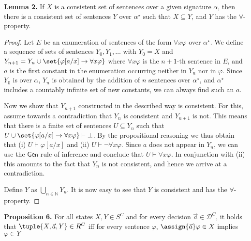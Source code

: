 \textbf{Lemma 2.}
    If $X$ is a consistent set of sentences over a given signature $\alpha$, then there is a consistent set of sentences $Y$ over $\alpha^\star$ such that $X\subseteq Y$, and $Y$ has the $\forall$-property.  


\begin{proof}
    Let $E$ be an enumeration of sentences of the form $\forall x \varphi$ over $\alpha^\star$. We define a sequence of sets of sentences $Y_0,Y_1,\ldots$ with $Y_0=X$ and $Y_{n+1}=Y_n \cup \set{ \varphi[a/x]\to \forall x \varphi}$ where $\forall x \varphi$ is the $n+1$-th sentence in $E$, and $a$ is the first constant in the enumeration occurring neither in $Y_n$ nor in $\varphi$. Since $Y_0$ is over $\alpha$, $Y_n$ is obtained by the addition of $n$ sentences over $\alpha^\star$, and $\alpha^\star$ includes a countably infinite set of new constants, we can always find such an $a$. 
    
    Now we show that $Y_{n+1}$ constructed in the described way is consistent. For this, assume towards a contradiction that $Y_n$ is consistent and $Y_{n+1}$ is not. This means that there is a finite set of sentences $U\subseteq Y_n$ such that $U\cup \set{\varphi [a/x]\to \forall x \varphi}\vdash \bot$. By the propositional reasoning we thus obtain that (i) $U\vdash \varphi [a/x]$ and (ii) $U\vdash \neg \forall x \varphi$. Since $a$ does not appear in $Y_n$, we can use the  $\mathsf{Gen}$ rule of inference and conclude that $U\vdash \forall x \varphi$. In conjunction with (ii) this amounts to the fact that $Y_n$ is not consistent, and hence we arrive at a contradiction.
    
    Define $Y$ as $\bigcup_{n\in \mathbb{N} }Y_n$. It is now easy to see that $Y$ is consistent and has the $\forall$-property. 
\end{proof}

\textbf{Proposition 6.}
    For all states $X, Y \in S^C$ %
    and for every decision $\vec{a} \in \mathcal{D}^C$, it holds that $\tuple{X,\vec{a},Y}\in R^C$ iff for every sentence $\varphi$, $\assign{\vec{a}}\varphi\in X $ implies $\varphi\in Y$

